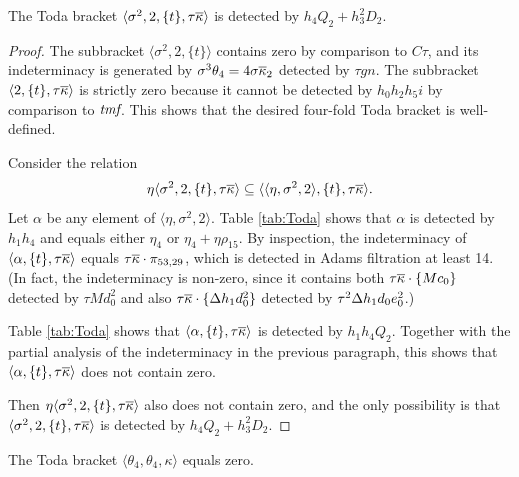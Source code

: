 \begin{lemma}
\label{lem:sigma^2,2,T,tkappabar}
The Toda bracket
$\langle \sigma^2, 2, \{t\}, \tau \overline{\kappa} \rangle$
is detected by $h_4 Q_2 + h_3^2 D_2$.
\end{lemma}

\begin{proof}
The subbracket $\langle \sigma^2, 2, \{ t \} \rangle$
contains zero by comparison to $C\tau$, and its indeterminacy
is generated by $\sigma^3 \theta_4 = 4 \sigma \overline{\kappa}_2$
detected by $\tau g n$.
The subbracket $\langle 2, \{t\}, \tau \overline{\kappa} \rangle$
is strictly zero because it cannot be detected by
$h_0 h_2 h_5 i$ by comparison to $\textit{tmf}$.
This shows that the desired four-fold Toda bracket is well-defined.

Consider the relation
\[
\eta \langle \sigma^2, 2, \{t\}, \tau \overline{\kappa} \rangle \subseteq
\langle \langle \eta, \sigma^2, 2 \rangle, \{t\}, \tau \overline{\kappa} \rangle.
\]
Let $\alpha$ be any element of $\langle \eta, \sigma^2, 2 \rangle$.
Table \ref{tab:Toda} shows that $\alpha$ 
is detected by $h_1 h_4$ and 
equals either $\eta_4$ or $\eta_4 + \eta \rho_{15}$.
By inspection, the indeterminacy of
$\langle \alpha, \{t\}, \tau \overline{\kappa} \rangle$
equals $\tau \overline{\kappa} \cdot \pi_{53,29}$, which 
is detected in Adams filtration at least 14.  (In fact, 
the indeterminacy is non-zero, since it contains both
$\tau \overline{\kappa} \cdot \{M c_0\}$ detected by
$\tau M d_0^2$ and also
$\tau \overline{\kappa} \cdot \{\Delta h_1 d_0^2\}$ detected by
$\tau^2 \Delta h_1 d_0 e_0^2$.)

Table \ref{tab:Toda} shows that
$\langle \alpha, \{t\}, \tau \overline{\kappa} \rangle$ is detected
by $h_1 h_4 Q_2$.
Together with the partial analysis of the indeterminacy in the
previous paragraph, this shows that 
$\langle \alpha, \{t\}, \tau \overline{\kappa} \rangle$ does
not contain zero.

Then 
$\eta \langle \sigma^2, 2, \{t\}, \tau \overline{\kappa} \rangle$
also does not contain zero, and the only possibility is that
$\langle \sigma^2, 2, \{t\}, \tau \overline{\kappa} \rangle$ 
is detected by $h_4 Q_2 + h_3^2 D_2$.
\end{proof}

\begin{lemma}
\label{lem:theta4,theta4,kappa}
The Toda bracket $\langle \theta_4, \theta_4, \kappa \rangle$
equals zero.
\end{lemma}

